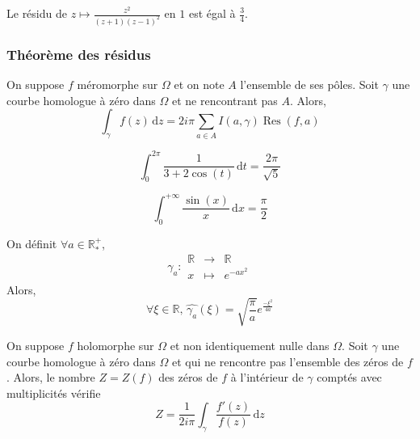 	\begin{example}
		Le résidu de $z \mapsto \frac{z^2}{(z+1)(z-1)^2}$ en $1$ est égal à $\frac{3}{4}$.
	\end{example}

	\subsubsection{Théorème des résidus}

	\begin{theorem}
		On suppose $f$ méromorphe sur $\Omega$ et on note $A$ l'ensemble de ses pôles. Soit $\gamma$ une courbe homologue à zéro dans $\Omega$ et ne rencontrant pas $A$. Alors,
		\[ \int_\gamma f(z) \, \mathrm{d}z = 2i\pi \sum_{a \in A} I(a, \gamma) \operatorname{Res}(f, a) \]
	\end{theorem}


	\begin{example}
		\[ \int_{0}^{2\pi} \frac{1}{3 + 2\cos(t)} \, \mathrm{d}t = \frac{2\pi}{\sqrt{5}} \]
	\end{example}

	\begin{example}
		\[ \int_{0}^{+\infty} \frac{\sin(x)}{x} \, \mathrm{d}x = \frac{\pi}{2} \]
	\end{example}


	\begin{example}
		On définit $\forall a \in \mathbb{R}^+_*$,
		\[ \gamma_a :
		\begin{array}{ccc}
			\mathbb{R} &\rightarrow& \mathbb{R} \\
			x &\mapsto& e^{-ax^2}
		\end{array}
		\]
		Alors,
		\[ \forall \xi \in \mathbb{R}, \, \widehat{\gamma_a}(\xi) = \sqrt{\frac{\pi}{a}} e^{\frac{- \xi^2}{4a}} \]
	\end{example}


	\begin{application}
		On suppose $f$ holomorphe sur $\Omega$ et non identiquement nulle dans $\Omega$. Soit $\gamma$ une courbe homologue à zéro dans $\Omega$ et qui ne rencontre pas l'ensemble des zéros de $f$. Alors, le nombre $Z = Z(f)$ des zéros de $f$ à l'intérieur de $\gamma$ comptés avec multiplicités vérifie
		\[ Z = \frac{1}{2i\pi} \int_\gamma \frac{f'(z)}{f(z)} \, \mathrm{d}z \]
	\end{application}

